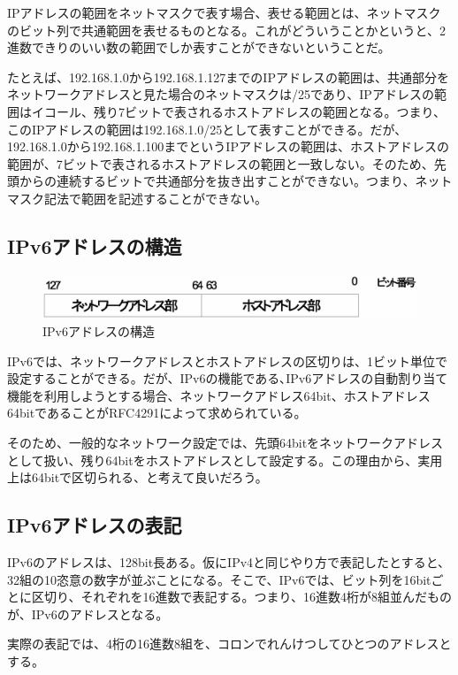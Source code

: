 IPアドレスの範囲をネットマスクで表す場合、表せる範囲とは、ネットマスクのビット列で共通範囲を表せるものとなる。これがどういうことかというと、2進数できりのいい数の範囲でしか表すことができないということだ。

たとえば、192.168.1.0から192.168.1.127までのIPアドレスの範囲は、共通部分をネットワークアドレスと見た場合のネットマスクは/25であり、IPアドレスの範囲はイコール、残り7ビットで表されるホストアドレスの範囲となる。つまり、このIPアドレスの範囲は192.168.1.0/25として表すことができる。だが、192.168.1.0から192.168.1.100までというIPアドレスの範囲は、ホストアドレスの範囲が、7ビットで表されるホストアドレスの範囲と一致しない。そのため、先頭からの連続するビットで共通部分を抜き出すことができない。つまり、ネットマスク記法で範囲を記述することができない。

\subsection{IPv6アドレスの構造}

\begin{figure}[htbp]
	\includegraphics[width=12cm,clip]{draw/ip6addr.eps}
	\caption{IPv6アドレスの構造}
	\label{fig:ipaddr}
\end{figure}


IPv6では、ネットワークアドレスとホストアドレスの区切りは、1ビット単位で設定することができる。だが、IPv6の機能である､IPv6アドレスの自動割り当て機能を利用しようとする場合、ネットワークアドレス64bit、ホストアドレス64bitであることがRFC4291によって求められている。

そのため、一般的なネットワーク設定では、先頭64bitをネットワークアドレスとして扱い、残り64bitをホストアドレスとして設定する。この理由から、実用上は64bitで区切られる、と考えて良いだろう。

\subsection{IPv6アドレスの表記}
IPv6のアドレスは、128bit長ある。仮にIPv4と同じやり方で表記したとすると、32組の10恣意の数字が並ぶことになる。そこで、IPv6では、ビット列を16bitごとに区切り、それぞれを16進数で表記する。つまり、16進数4桁が8組並んだものが、IPv6のアドレスとなる。

実際の表記では、4桁の16進数8組を、コロンでれんけつしてひとつのアドレスとする。

